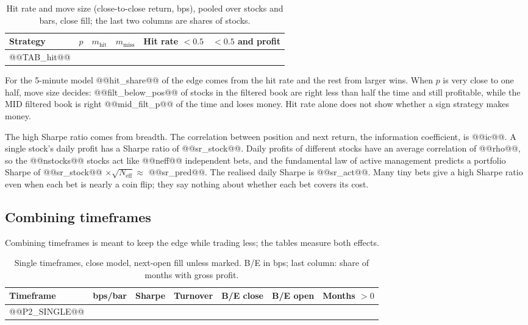 \documentclass[11pt,a4paper]{article}
\begin{document}
\begin{table}[htbp]
\centering
\caption{Hit rate and move size (close-to-close return, bps), pooled over stocks and bars, close fill;
the last two columns are shares of stocks.}
\label{tab:hit}
\small
\begin{tabular}{@{}lrrrrr@{}}
\toprule
Strategy & $p$ & $m_{\text{hit}}$ & $m_{\text{miss}}$ & Hit rate $<0.5$ & $<0.5$ and profit \\
\midrule
@@TAB_hit@@
\bottomrule
\end{tabular}
\end{table}

For the 5-minute model @@hit_share@@ of the edge comes from the hit rate and the rest from larger wins.
When $p$ is very close to one half, move size decides: @@filt_below_pos@@ of stocks in the filtered book
are right less than half the time and still profitable, while the MID filtered book is right
@@mid_filt_p@@ of the time and loses money. Hit rate alone does not show whether a sign strategy makes
money.

The high Sharpe ratio comes from breadth. The correlation between position and next return, the
information coefficient, is @@ic@@. A single stock's daily profit has a Sharpe ratio of @@sr_stock@@.
Daily profits of different stocks have an average correlation of @@rho@@, so the @@nstocks@@ stocks act like
@@neff@@ independent bets, and the fundamental law of active management \citep{grinold1989} predicts
a portfolio Sharpe of @@sr_stock@@ $\times\sqrt{N_{\text{eff}}}\approx$ @@sr_pred@@. The realised daily
Sharpe is @@sr_act@@. Many tiny bets give a high Sharpe ratio even when each bet is nearly a coin flip; they
say nothing about whether each bet covers its cost.

\subsection{Combining timeframes}
\label{sec:mtf}

Combining timeframes is meant to keep the edge while trading less; the tables measure both effects.


\begin{table}[htbp]
\centering
\caption{Single timeframes, close model, next-open fill unless marked. B/E in bps; last column: share of
months with gross profit.}
\label{tab:single}
\small
\begin{tabular}{@{}lrrrrrr@{}}
\toprule
Timeframe & bps/bar & Sharpe & Turnover & B/E close & B/E open & Months $>0$ \\
\midrule
@@P2_SINGLE@@
\bottomrule
\end{tabular}
\end{table}
\end{document}

